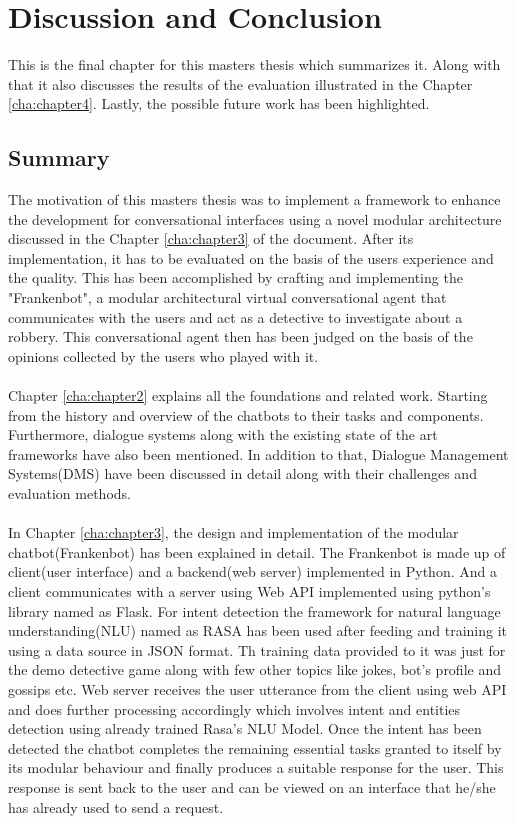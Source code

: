 \chapter{Discussion and Conclusion\label{cha:chapter5}}
This is the final chapter for this masters thesis which summarizes it. Along with that it also discusses the results of the evaluation illustrated in the Chapter \ref{cha:chapter4}. Lastly, the possible future work has been highlighted.

\section{Summary}
The motivation of this masters thesis was to implement a framework to enhance the development for conversational interfaces using a novel modular architecture discussed in the Chapter \ref{cha:chapter3} of the document. After its implementation, it has to be evaluated on the basis of the users experience and the quality. This has been accomplished by crafting and implementing the "Frankenbot", a modular architectural virtual conversational agent that communicates with the users and act as a detective to investigate about a robbery. This conversational agent then has been judged on the basis of the opinions collected by the users who played with it.
\\~\\
Chapter \ref{cha:chapter2} explains all the foundations and related work. Starting from the history and overview of the chatbots to their tasks and components. Furthermore, dialogue systems along with the existing state of the art frameworks have also been mentioned. In addition to that, Dialogue Management Systems(DMS) have been discussed in detail along with their challenges and evaluation methods.
\\~\\
In Chapter \ref{cha:chapter3}, the design and implementation of the modular chatbot(Frankenbot) has been explained in detail. The Frankenbot is made up of client(user interface) and a backend(web server) implemented in Python. And a client communicates with a server using Web API implemented using python's library named as Flask. For intent detection the framework for natural language understanding(NLU) named as RASA has been used after feeding and training it using a data source in JSON format. Th training data provided to it was just for the demo detective game along with few other topics like jokes, bot's profile and gossips etc. Web server receives the user utterance from the client using web API and does further processing accordingly which involves intent and entities detection using already trained Rasa's NLU Model. Once the intent has been detected the chatbot completes the remaining essential tasks granted to itself by its modular behaviour and finally produces a suitable response for the user. This response is sent back to the user and can be viewed on an interface that he/she has already used to send a request.
